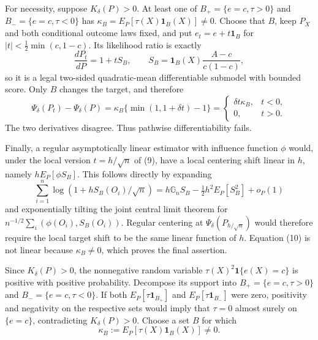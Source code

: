 For necessity, suppose \(K_\delta(P)>0\).  At least one of
\(B_+=\{e=c,\tau>0\}\) and \(B_-=\{e=c,\tau<0\}\) has
\(\kappa_B=E_P[\tau(X)\mathbf1_B(X)]\ne0\).  Choose that \(B\), keep \(P_X\) and both conditional outcome laws fixed, and put \(e_t=e+t\mathbf1_B\) for
\(|t|<\frac12\min(c,1-c)\).  Its likelihood ratio is exactly
\begin{equation}
 \frac{dP_t}{dP}=1+tS_B,\qquad
 S_B=\mathbf1_B(X)\frac{A-c}{c(1-c)},                                                     \tag{9}
\end{equation}
so it is a legal two-sided quadratic-mean differentiable submodel with bounded score.  Only \(B\) changes the target, and therefore
\begin{equation}
 \Psi_\delta(P_t)-\Psi_\delta(P)
 =\kappa_B\{\min(1,1+\delta t)-1\}
 =\begin{cases}\delta t\kappa_B,&t<0,\\0,&t>0.\end{cases}                              \tag{10}
\end{equation}
The two derivatives disagree.  Thus pathwise differentiability fails.

Finally, a regular asymptotically linear estimator with influence function \(\phi\) would, under the local version \(t=h/\sqrt n\) of (9), have a local centering shift linear in \(h\), namely \(hE_P[\phi S_B]\).  This follows directly by expanding
\begin{equation}
 \sum_{i=1}^n\log(1+hS_B(O_i)/\sqrt n)
 =h\mathbb G_nS_B-\tfrac12h^2E_P[S_B^2]+o_P(1)
\end{equation}
and exponentially tilting the joint central limit theorem for
\(n^{-1/2}\sum_i(\phi(O_i),S_B(O_i))\).  Regular centering at
\(\Psi_\delta(P_{h/\sqrt n})\) would therefore require the local target shift to be the same linear function of \(h\).  Equation (10) is not linear because \(\kappa_B\ne0\), which proves the final assertion.

Since \(K_\delta(P)>0\), the nonnegative random variable
\(\tau(X)^2\mathbf1\{e(X)=c\}\) is positive with positive probability.  Decompose its support into
\(B_+=\{e=c,\tau>0\}\) and \(B_-=\{e=c,\tau<0\}\).  If both
\(E_P[\tau\mathbf1_{B_+}]\) and \(E_P[\tau\mathbf1_{B_-}]\) were zero, positivity and negativity on the respective sets would imply that \(\tau=0\) almost surely on \(\{e=c\}\), contradicting \(K_\delta(P)>0\).  Choose a set \(B\) for which
\begin{equation}
 \kappa_B:=E_P[\tau(X)\mathbf1_B(X)]\ne0.                                                 \tag{11}
\end{equation}

